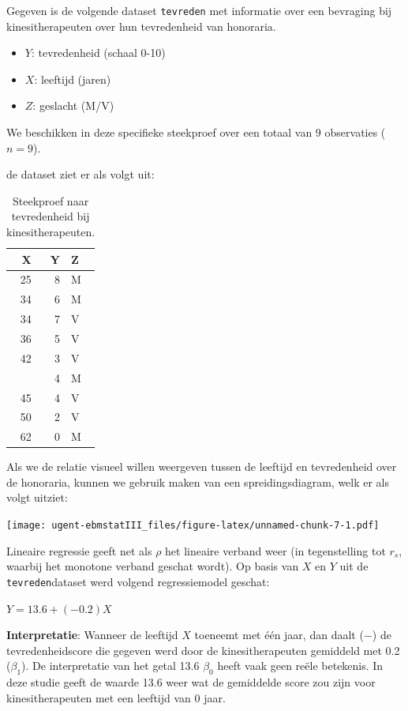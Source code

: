 \documentclass[
]{book}
\providecommand{\tightlist}{%
  \setlength{\itemsep}{0pt}\setlength{\parskip}{0pt}}
\theoremstyle{definition}
\theoremstyle{definition}
\theoremstyle{definition}
\theoremstyle{definition}
\theoremstyle{remark}
\begin{document}
Gegeven is de volgende dataset \texttt{tevreden} met informatie over een bevraging bij kinesitherapeuten over hun tevredenheid van honoraria.

\begin{itemize}
\tightlist
\item
  \(Y\): tevredenheid (schaal 0-10)
\item
  \(X\): leeftijd (jaren)
\item
  \(Z\): geslacht (M/V)
\end{itemize}

We beschikken in deze specifieke steekproef over een totaal van 9 observaties (\(n = 9\)).

de dataset ziet er als volgt uit:

\begin{table}

\caption{\label{tab:tevereden2}Steekproef naar tevredenheid bij kinesitherapeuten.}
\centering
\begin{tabular}[t]{rrl}
\toprule
X & Y & Z\\
\midrule
25 & 8 & M\\
34 & 6 & M\\
34 & 7 & V\\
36 & 5 & V\\
42 & 3 & V\\
\addlinespace
44 & 4 & M\\
45 & 4 & V\\
50 & 2 & V\\
62 & 0 & M\\
\bottomrule
\end{tabular}
\end{table}

Als we de relatie visueel willen weergeven tussen de leeftijd en tevredenheid over de honoraria, kunnen we gebruik maken van een spreidingsdiagram, welk er als volgt uitziet:

\texttt{[image: ugent-ebmstatIII\_files/figure-latex/unnamed-chunk-7-1.pdf]}

Lineaire regressie geeft net als \(\rho\) het lineaire verband weer (in tegenstelling tot \(r_s\), waarbij het monotone verband geschat wordt). Op basis van \(X\) en \(Y\) uit de \texttt{tevreden}dataset werd volgend regressiemodel geschat:

\(Y = 13.6 + (-0.2)X\)

\textbf{Interpretatie}: Wanneer de leeftijd \(X\) toeneemt met één jaar, dan daalt (\(-\)) de tevredenheidscore die gegeven werd door de kinesitherapeuten gemiddeld met 0.2 (\(\beta_1\)). De interpretatie van het getal 13.6 \(\beta_0\) heeft vaak geen reële betekenis. In deze studie geeft de waarde 13.6 weer wat de gemiddelde score zou zijn voor kinesitherapeuten met een leeftijd van 0 jaar.
\end{document}
